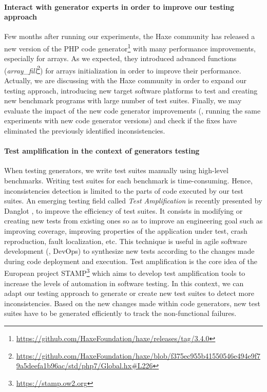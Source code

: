 \paragraph{Interact with generator experts in order to improve our testing approach}
Few months after running our experiments, the Haxe community has released a new version of the PHP code generator\footnote{\url{https://github.com/HaxeFoundation/haxe/releases/tag/3.4.0}} with many performance improvements, especially for arrays. As we expected, they introduced advanced functions (\textit{array\_fill}\footnote{\url{https://github.com/HaxeFoundation/haxe/blob/f375ec955b41550546e494e9f79a5deefa1b96ac/std/php7/Global.hx\#L226}}) for arrays initialization in order to improve their performance. Actually, we are discussing with the Haxe community in order to expand our testing approach, introducing new target software platforms to test and creating new benchmark programs with large number of test suites. Finally, we may evaluate the impact of the new code generator improvements (\ie, running the same experiments with new code generator versions) and check if the fixes have eliminated the previously identified inconsistencies.

\paragraph{Test amplification in the context of generators testing}
When testing generators, we write test suites manually using high-level benchmarks. 
Writing test suites for each benchmark is time-consuming.
Hence, inconsistencies detection is limited to the parts of code executed by our test suites. An emerging testing field called \textit{Test Amplification} is recently presented by Danglot \etal \cite{danglot2017emerging}, to improve the efficiency of test suites. It consists in modifying or creating new tests from existing ones so as to improve an engineering goal such as improving coverage, improving properties of the application under test, crash reproduction, fault localization, etc. This technique is useful in agile software development (\ie, DevOps) to synthesize new tests according to the changes made during code deployment and execution. Test amplification is the core idea of the European project STAMP\footnote{\url{https://stamp.ow2.org}} which aims to develop test amplification tools to increase the levels of automation in software testing.
In this context, we can adapt our testing approach to generate or create new test suites to detect more inconsistencies. Based on the new changes made within code generators, new test suites have to be generated efficiently to track the non-functional failures.


